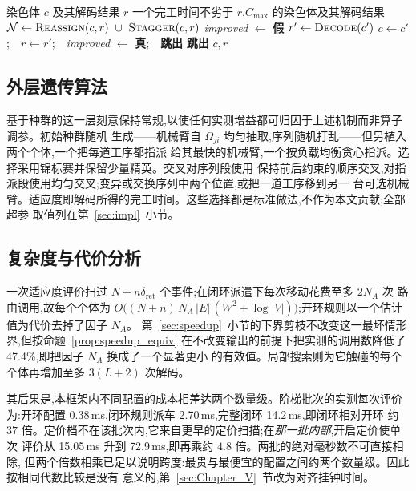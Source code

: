 \documentclass[manuscript,screen,review]{acmart}
\newcommand{\RouteCallCut}{47.4\%}
\newcommand{\MsOpen}{0.38}
\newcommand{\MsLoopRule}{2.70}
\newcommand{\MsLoopProbe}{14.2}
\newcommand{\MsPriced}{72.9}
\newcommand{\MsPricedRef}{15.05}         %
\begin{document}
\begin{algorithm}[t]
\caption{\textsc{ContentionGuidedSearch}:冲突制导的局部搜索}
\label{alg:ls}
\small
\begin{algorithmic}[1]
\Require 染色体 $c$ 及其解码结果 $r$
\Ensure 一个完工时间不劣于 $r.C_{\max}$ 的染色体及其解码结果
  \State $\mathcal{N}\gets\textsc{Reassign}(c,r)\ \cup\ \textsc{Stagger}(c,r)$
  \State \textit{improved} $\gets$ \textbf{假}
    \State $r'\gets\textsc{Decode}(c')$
      \State $c\gets c'$;\ \ $r\gets r'$;\ \ \textit{improved} $\gets$
             \textbf{真};\ \ \textbf{跳出}
    \EndIf
  \EndFor
   \State \textbf{跳出} \EndIf
\EndFor
\State \Return $c,r$
\end{algorithmic}
\end{algorithm}

\subsection{外层遗传算法}

基于种群的这一层刻意保持常规,以使任何实测增益都可归因于上述机制而非算子调参。初始种群随机
生成——机械臂自 $\Omega_{ji}$ 均匀抽取,序列随机打乱——但另植入两个个体,一个把每道工序都指派
给其最快的机械臂,一个按负载均衡贪心指派。选择采用锦标赛并保留少量精英。交叉对序列段使用
保持前后约束的顺序交叉,对指派段使用均匀交叉;变异或交换序列中两个位置,或把一道工序移到另一
台可选机械臂。适应度即解码所得的完工时间。这些选择都是标准做法,不作为本文贡献;全部超参
取值列在第~\ref{sec:impl}~小节。

\subsection{复杂度与代价分析}

一次适应度评价扫过 $N+n\delta_{\mathrm{ret}}$ 个事件;在闭环派遣下每次移动花费至多 $2N_A$ 次
路由调用,故每个个体为
$O\bigl((N+n)\,N_A\,|E|\,(W^{2}+\log|V|)\bigr)$;开环规则以一个估计值为代价去掉了因子 $N_A$。
第~\ref{sec:speedup}~小节的下界剪枝不改变这一最坏情形界,但按命题~\ref{prop:speedup_equiv}
在不改变输出的前提下把实测的调用数降低了 \RouteCallCut{},即把因子 $N_A$ 换成了一个显著更小
的有效值。局部搜索则为它触碰的每个个体再增加至多 $3(L+2)$ 次解码。

其后果是,本框架内不同配置的成本相差达两个数量级。阶梯批次的实测每次评价为:开环配置
\MsOpen{}\,ms,闭环规则派车 \MsLoopRule{}\,ms,完整闭环 \MsLoopProbe{}\,ms,即闭环相对开环
约 $37$ 倍。定价档不在该批次内,它来自更早的定价扫描;在\emph{那一批内部},开启定价使单次
评价从 \MsPricedRef{}\,ms 升到 \MsPriced{}\,ms,即再乘约 $4.8$ 倍。两批的绝对毫秒数不可直接相除,
但两个倍数相乘已足以说明跨度:最贵与最便宜的配置之间约两个数量级。因此按相同代数比较是没有
意义的,第~\ref{sec:Chapter_V}~节改为对齐挂钟时间。
\end{document}
